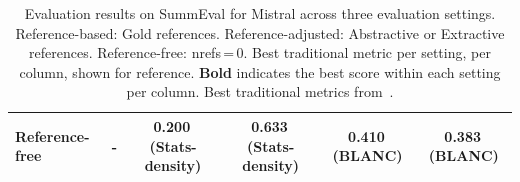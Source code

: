 \begin{table}[h]
\begin{tabular}{lccccc}
\rowcolor{reffree}
Reference-free & - & 0.200\,(Stats-density) & 0.633\,(Stats-density) & 0.410\,(BLANC) & 0.383\,(BLANC) \\
\bottomrule
\end{tabular}
\caption{%
  Evaluation results on SummEval for Mistral across three evaluation settings.   \colorbox{refbased}{\vphantom{x} Reference-based}: Gold references.
  \colorbox{refadj}{\vphantom{x} Reference-adjusted}: Abstractive or Extractive references.
  \colorbox{reffree}{\vphantom{x} Reference-free}: nrefs\,=\,0.
Best traditional metric per setting, per column, shown for reference.  \textbf{Bold} indicates the best score within each setting per column. Best traditional metrics from~.
}
\label{tab:combined-mistral}
\end{table}


